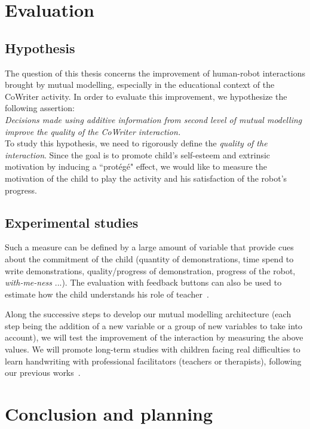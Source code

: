 \documentclass[10pt,a4paper]{article}
\begin{document}
\section{Evaluation}

\subsection{Hypothesis}

The question of this thesis concerns the improvement of human-robot interactions brought by mutual modelling, especially in the educational context of the CoWriter activity. In order to evaluate this improvement, we hypothesize the following assertion:\\
\textit{Decisions made using additive information from second level of mutual modelling improve the quality of the CoWriter interaction.}\\
To study this hypothesis, we need to rigorously define the \textit{quality of the interaction}. Since the goal is to promote child's self-esteem and extrinsic motivation by inducing a ``prot\'eg\'e" effect, we would like to measure the motivation of the child to play the activity and his satisfaction of the robot's progress.

\subsection{Experimental studies}

Such a measure can be defined by a large amount of variable that provide cues about the commitment of the child (quantity of demonstrations, time spend to write demonstrations, quality/progress of demonstration, progress of the robot, \textit{with-me-ness} ...). The evaluation with feedback buttons can also be used to estimate how the child understands his role of teacher~\cite{jacq2016building}. 

Along the successive steps to develop our mutual modelling architecture (each step being the addition of a new variable or a group of new variables to take into account), we will test the improvement of the interaction by measuring the above values. We will promote long-term studies with children facing real difficulties to learn handwriting with professional facilitators (teachers or therapists), following our previous works~\cite{jacq2016building}. 

\section{Conclusion and planning}
\end{document}
